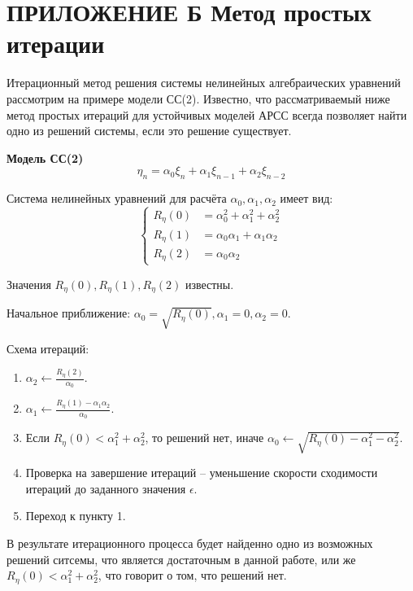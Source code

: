 \documentclass[12pt, fleqn]{article}
\begin{document}
\section*{ПРИЛОЖЕНИЕ Б Метод простых итерации}
{
	Итерационный метод решения системы нелинейных алгебраических уравнений рассмотрим на примере модели СС(2). Известно, что рассматриваемый ниже метод простых итераций для устойчивых моделей АРСС всегда позволяет найти одно из решений системы, если это решение существует. \medskip
		
	\textbf{Модель СС(2)}
	\begin{equation*}
		\eta_n = \alpha_0 \xi_n + \alpha_1 \xi_{n - 1} + \alpha_2 \xi_{n - 2}
	\end{equation*}
		
	Система нелинейных уравнений для расчёта $\alpha_0, \alpha_1, \alpha_2$ имеет вид:
	\begin{equation*}
		\left\{
		\begin{split}
			R_{\eta}(0) &= \alpha_0^2 + \alpha_1^2 + \alpha_2^2 \\
			R_{\eta}(1) &= \alpha_0 \alpha_1 + \alpha_1 \alpha_2 \\
			R_{\eta}(2) &= \alpha_0 \alpha_2
		\end{split}
		\right.
	\end{equation*}
						
	Значения $R_{\eta}(0), R_{\eta}(1), R_{\eta}(2)$ известны. \medskip
	  
	Начальное приближение: $\alpha_0 = \sqrt{R_{\eta}(0)}, \alpha_1 = 0, \alpha_2 = 0$. \medskip
	  
	Схема итераций:
	\begin{enumerate}
		\item {$\alpha_2 \leftarrow \displaystyle\frac{R_{\eta}(2)}{\alpha_0}$.}
		\item {$\alpha_1 \leftarrow \displaystyle\frac{R_{\eta}(1) - \alpha_1 \alpha_2}{\alpha_0}$.}
		\item {Если $R_{\eta}(0) < \alpha_1^2 + \alpha_2^2$, то решений нет, иначе $\alpha_0 \leftarrow \displaystyle\sqrt{R_{\eta}(0) - \alpha_1^2 - \alpha_2^2}$.}
		\item {Проверка на завершение итераций -- уменьшение скорости сходимости итераций до заданного значения $\epsilon$.}
		\item {Переход к пункту 1.}
	\end{enumerate}
	  
	В результате итерационного процесса будет найденно одно из возможных решений ситсемы, что является достаточным в данной работе, или же $R_{\eta}(0) < \alpha_1^2 + \alpha_2^2$, что говорит о том, что решений нет.
}
			
\end{document}

